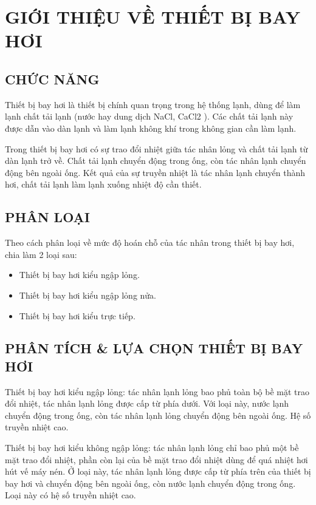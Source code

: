 \fancyhead[L]{\leftmark}
\section{GIỚI THIỆU VỀ THIẾT BỊ BAY HƠI}
\subsection{CHỨC NĂNG}
Thiết bị bay hơi là thiết bị chính quan trọng trong hệ thống lạnh, dùng để làm lạnh chất tải lạnh (nước hay dung dịch NaCl, CaCl{\scriptsize 2} ). Các chất tải lạnh này được dẫn vào dàn lạnh và làm lạnh không khí trong không gian cần làm lạnh.

Trong thiết bị bay hơi có sự trao đổi nhiệt giữa tác nhân lỏng và chất tải lạnh từ dàn lạnh trở về. Chất tải lạnh chuyển động trong ống, còn tác nhân lạnh chuyển động bên ngoài ống. Kết quả của sự truyền nhiệt là tác nhân lạnh chuyển thành hơi, chất tải lạnh làm lạnh xuống nhiệt độ cần thiết.

\subsection{PHÂN LOẠI}
Theo cách phân loại về mức độ hoán chỗ của tác nhân trong thiết bị bay hơi, chia làm 2 loại sau:
\begin{itemize}
	\item Thiết bị bay hơi kiểu ngập lỏng.
	\item Thiết bị bay hơi kiểu ngập lỏng nửa.
	\item Thiết bị bay hơi kiểu trực tiếp.
\end{itemize}
\subsection{PHÂN TÍCH \& LỰA CHỌN THIẾT BỊ BAY HƠI}
Thiết bị bay hơi kiểu ngập lỏng: tác nhân lạnh lỏng bao phủ toàn bộ bề mặt trao đổi nhiệt, tác nhân lạnh lỏng được cấp từ phía dưới. Với loại này, nước lạnh chuyển động trong ống, còn tác nhân lạnh lỏng chuyển động bên ngoài ống. Hệ số truyền nhiệt cao.

Thiết bị bay hơi kiểu không ngập lỏng: tác nhân lạnh lỏng chỉ bao phủ một bề mặt trao đổi nhiệt, phần còn lại của bề mặt trao đổi nhiệt dùng để quá nhiệt hơi hút vế máy nén. Ở loại này, tác nhân lạnh lỏng được cấp từ phía trên của thiết bị bay hơi và chuyển động bên ngoài ống, còn nước lạnh chuyển động trong ống. Loại này có hệ số truyền nhiệt cao.

